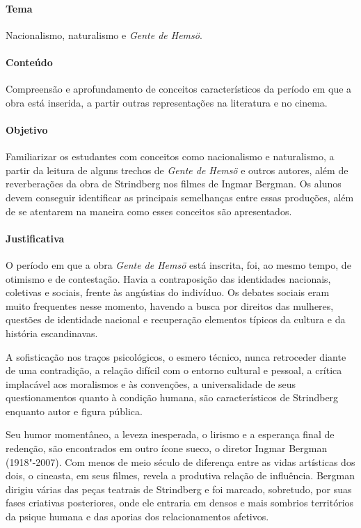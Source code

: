 \documentclass[12pt]{extarticle}
\begin{document}
\paragraph{Tema} Nacionalismo, naturalismo e \emph{Gente de Hemsö}.

\paragraph{Conteúdo} Compreensão e aprofundamento de conceitos característicos da período 
em que a obra está inserida, a partir outras representações na literatura e no cinema. 

\paragraph{Objetivo} Familiarizar os estudantes com conceitos como nacionalismo e naturalismo, 
a partir da leitura de alguns trechos de \emph{Gente de Hemsö} e outros autores, além de reverberações 
da obra de Strindberg nos filmes de Ingmar Bergman. 
Os alunos devem conseguir identificar as principais semelhanças entre essas produções, além de se atentarem na 
maneira como esses conceitos são apresentados. 

\paragraph{Justificativa} O período em que a obra \emph{Gente de Hemsö} está inscrita, foi, 
ao mesmo tempo, de otimismo e de contestação. Havia a contraposição das identidades nacionais, 
coletivas e sociais, frente às angústias do indivíduo. Os debates sociais eram muito frequentes 
nesse momento, havendo a busca por direitos das mulheres, questões de identidade nacional e
recuperação elementos típicos da cultura e da história escandinavas.

A sofisticação nos traços psicológicos, o esmero técnico, nunca retroceder diante de uma 
contradição, a relação difícil com o entorno cultural e pessoal, a crítica implacável aos 
moralismos e às convenções, a universalidade de seus questionamentos quanto
à condição humana, são característicos de Strindberg enquanto autor e figura pública. 

Seu humor momentâneo, a leveza inesperada, o lirismo e a esperança final de redenção, são 
encontrados em outro ícone sueco, o diretor Ingmar Bergman (1918"-2007). Com menos de meio século 
de diferença entre as vidas artísticas dos dois, o cineasta, em seus filmes, revela a produtiva 
relação de influência. Bergman dirigiu várias das peças teatrais de
Strindberg e foi marcado, sobretudo, por suas fases criativas
posteriores, onde ele entraria em densos e mais sombrios
territórios da psique humana e das aporias dos relacionamentos
afetivos.
\end{document}
